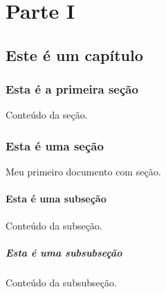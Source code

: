 \documentclass{report}
\begin{document}
	
	\part{Parte I}
	\chapter{Este é um capítulo}
	\section{Esta é a primeira seção}
	Conteúdo da seção.
	\section*{Esta é uma seção}
	Meu primeiro documento com seção.
	\subsection{Esta é uma subseção}
	 
	Conteúdo da subseção.
	
	\subsubsection{Esta é uma subsubseção}
	Conteúdo da subsubseção.
	
	
	
\end{document}
